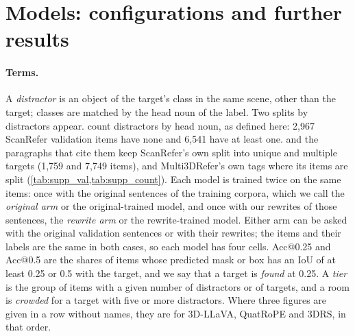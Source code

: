 \section{Models: configurations and further results}
\label{supp:models}

\paragraph{Terms.}
A \emph{distractor} is an object of the target's class in the same scene, other than the target; classes are matched by the head noun of the label.
Two splits by distractors appear.
 count distractors by head noun, as defined here: 2,967 ScanRefer validation items have none and 6,541 have at least one.
 and the paragraphs that cite them keep ScanRefer's own split into unique and multiple targets (1,759 and 7,749 items), and Multi3DRefer's own tags where its items are split (\cref{tab:supp_val,tab:supp_count}).
Each model is trained twice on the same items: once with the original sentences of the training corpora, which we call the \emph{original arm} or the original-trained model, and once with our rewrites of those sentences, the \emph{rewrite arm} or the rewrite-trained model.
Either arm can be asked with the original validation sentences or with their rewrites; the items and their labels are the same in both cases, so each model has four cells.
Acc@0.25 and Acc@0.5 are the shares of items whose predicted mask or box has an IoU of at least 0.25 or 0.5 with the target, and we say that a target is \emph{found} at 0.25.
A \emph{tier} is the group of items with a given number of distractors or of targets, and a room is \emph{crowded} for a target with five or more distractors.
Where three figures are given in a row without names, they are for 3D-LLaVA, QuatRoPE and 3DRS, in that order.

